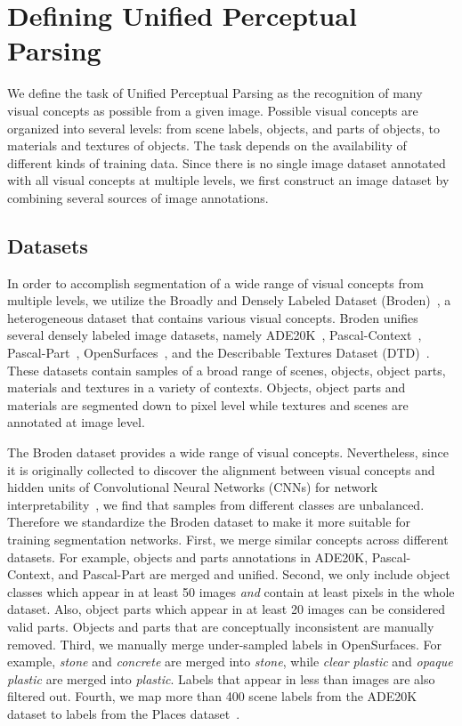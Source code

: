 \documentclass[runningheads]{llncs}
\begin{document}
\section{Defining Unified Perceptual Parsing}

We define the task of Unified Perceptual Parsing as the recognition of many visual concepts as possible from a given image. Possible visual concepts are organized into several levels: from scene labels, objects, and parts of objects, to materials and textures of objects. The task depends on the availability of different kinds of training data. Since there is no single image dataset annotated with all visual concepts at multiple levels, we first construct an image dataset by combining several sources of image annotations. 

\subsection{Datasets}

In order to accomplish segmentation of a wide range of visual concepts from multiple levels, we utilize the Broadly and Densely Labeled Dataset (Broden)~\cite{netdissect2017}, a heterogeneous dataset that contains various visual concepts. Broden unifies several densely labeled image datasets, namely ADE20K~\cite{zhou2017scene}, Pascal-Context~\cite{mottaghi_cvpr14}, Pascal-Part~\cite{chen_cvpr14}, OpenSurfaces~\cite{bell2013opensurfaces}, and the Describable Textures Dataset (DTD)~\cite{cimpoi2014describing}. These datasets contain samples of a broad range of scenes, objects, object parts, materials and textures in a variety of contexts. Objects, object parts and materials are segmented down to pixel level while textures and scenes are annotated at image level. 

The Broden dataset provides a wide range of visual concepts. Nevertheless, since it is originally collected to discover the alignment between visual concepts and hidden units of Convolutional Neural Networks (CNNs) for network interpretability~\cite{netdissect2017,netdissect2018}, we find that samples from different classes are unbalanced. Therefore we standardize the Broden dataset to make it more suitable for training segmentation networks. First, we merge similar concepts across different datasets. For example, objects and parts annotations in ADE20K, Pascal-Context, and Pascal-Part are merged and unified. Second, we only include object classes which appear in at least 50 images \emph{and} contain at least  pixels in the whole dataset. Also, object parts which appear in at least 20 images can be considered valid parts. Objects and parts that are conceptually inconsistent are manually removed. Third, we manually merge under-sampled labels in OpenSurfaces. For example, \textit{stone} and \textit{concrete} are merged into \textit{stone}, while \textit{clear plastic} and \textit{opaque plastic} are merged into \textit{plastic}. Labels that appear in less than  images are also filtered out. Fourth, we map more than 400 scene labels from the ADE20K dataset to  labels from the Places dataset~\cite{zhou2014learning}. 
\end{document}
